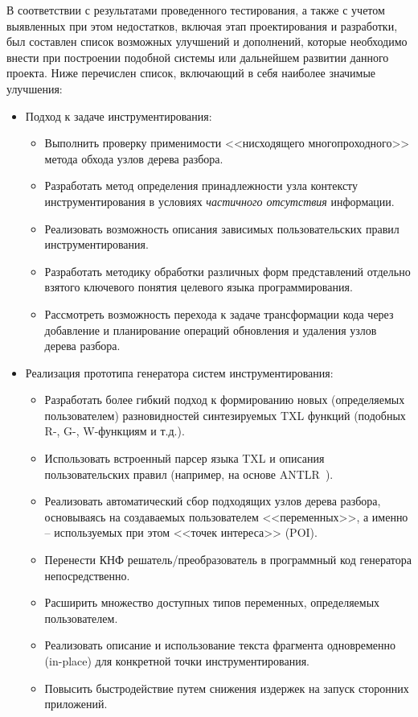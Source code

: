 В соответствии с результатами проведенного тестирования, а также с учетом выявленных при этом недостатков, включая этап проектирования и разработки, был составлен список возможных улучшений и дополнений, которые необходимо внести при построении подобной системы или дальнейшем развитии данного проекта.
Ниже перечислен список, включающий в себя наиболее значимые улучшения:

\begin{itemize}[noitemsep]
  \item Подход к задаче инструментирования:
    \begin{itemize}[noitemsep]
        \item Выполнить проверку применимости <<нисходящего многопроходного>> метода обхода узлов дерева разбора.
        \item Разработать метод определения принадлежности узла контексту инструментирования в условиях \textit{частичного отсутствия} информации.
        \item Реализовать возможность описания зависимых пользовательских правил инструментирования.
        \item Разработать методику обработки различных форм представлений отдельно взятого ключевого понятия целевого языка программирования.
        \item Рассмотреть возможность перехода к задаче трансформации кода через добавление и планирование операций обновления и удаления узлов дерева разбора.
    \end{itemize}

  \item Реализация прототипа генератора систем инструментирования:
    \begin{itemize}[noitemsep]
      \item Разработать более гибкий подход к формированию новых (определяемых пользователем) разновидностей синтезируемых TXL функций (подобных R-, G-, W-функциям и т.д.).
      \item Использовать встроенный парсер языка TXL и описания пользовательских правил (например, на основе ANTLR~\cite{antlr}).
      \item Реализовать автоматический сбор подходящих узлов дерева разбора, основываясь на создаваемых пользователем <<переменных>>, а именно -- используемых при этом <<точек интереса>> (POI).
      \item Перенести КНФ решатель/преобразователь в программный код генератора непосредственно.
      \item Расширить множество доступных типов переменных, определяемых пользователем.
      \item Реализовать описание и использование текста фрагмента одновременно (in-place) для конкретной точки инструментирования.
      \item Повысить быстродействие путем снижения издержек на запуск сторонних приложений.
    \end{itemize}
\end{itemize}
